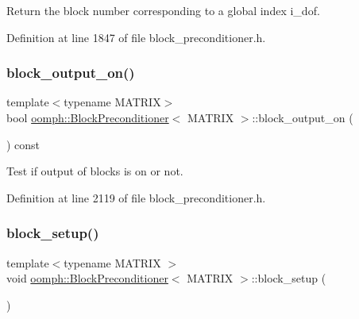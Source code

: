 Return the block number corresponding to a global index i\+\_\+dof. 



Definition at line 1847 of file block\+\_\+preconditioner.\+h.

\mbox{\label{classoomph_1_1BlockPreconditioner_a0bd0ab19a7501b79c16c1283766f0abb}} 
\subsubsection{\texorpdfstring{block\+\_\+output\+\_\+on()}{block\_output\_on()}}
{\footnotesize\ttfamily template$<$typename M\+A\+T\+R\+IX$>$ \\
bool \hyperlink{classoomph_1_1BlockPreconditioner}{oomph\+::\+Block\+Preconditioner}$<$ M\+A\+T\+R\+IX $>$\+::block\+\_\+output\+\_\+on (\begin{DoxyParamCaption}{ }\end{DoxyParamCaption}) const\hspace{0.3cm}{\ttfamily [inline]}}



Test if output of blocks is on or not. 



Definition at line 2119 of file block\+\_\+preconditioner.\+h.

\mbox{\label{classoomph_1_1BlockPreconditioner_af704c4816469cef4fed9d35a9ad651ec}} 
\subsubsection{\texorpdfstring{block\+\_\+setup()}{block\_setup()}\hspace{0.1cm}{\footnotesize\ttfamily [1/2]}}
{\footnotesize\ttfamily template$<$typename M\+A\+T\+R\+IX $>$ \\
void \hyperlink{classoomph_1_1BlockPreconditioner}{oomph\+::\+Block\+Preconditioner}$<$ M\+A\+T\+R\+IX $>$\+::block\+\_\+setup (\begin{DoxyParamCaption}{ }\end{DoxyParamCaption})\hspace{0.3cm}{\ttfamily [virtual]}}



